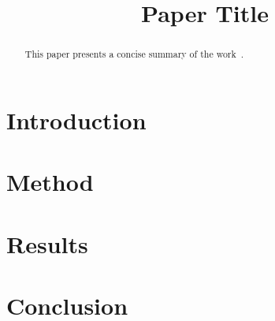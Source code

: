 \documentclass[conference]{IEEEtran}
\title{Paper Title}
\author{
  \IEEEauthorblockN{Author Name}
  \IEEEauthorblockA{Affiliation\\City, Country\\email@example.com}
}
\begin{document}
\maketitle

\begin{abstract}
This paper presents a concise summary of the work~\cite{example2026}.
\end{abstract}

\section{Introduction}

\section{Method}

\section{Results}

\section{Conclusion}



\end{document}
